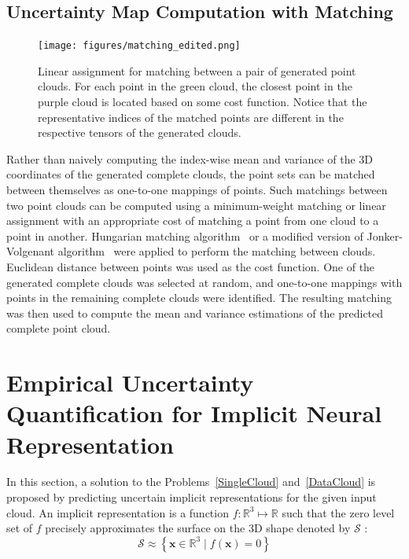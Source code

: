     \subsection{Uncertainty Map Computation with Matching}
    \begin{figure}[htb]
      \begin{center}
      \texttt{[image: figures/matching\_edited.png]}
      \end{center}
      \caption{Linear assignment for matching between a pair of generated point clouds. For each point in the green cloud, the closest point in the purple cloud is located based on some cost function. Notice that the representative indices of the matched points are different in the respective tensors of the generated clouds.}\label{fig:matching}
    \end{figure}
    Rather than naively computing the index-wise mean and variance of the 3D coordinates of the generated complete clouds, the point sets can be matched between themselves as one-to-one mappings of points. Such matchings between two point clouds can be computed using a minimum-weight matching or linear assignment with an appropriate cost of matching a point from one cloud to a point in another. Hungarian matching algorithm~\cite{Hungarian} or a modified version of Jonker-Volgenant algorithm~\cite{RectAssign} were applied to perform the matching between clouds. Euclidean distance between points was used as the cost function. One of the generated complete clouds was selected at random, and one-to-one mappings with points in the remaining complete clouds were identified. The resulting matching was then used to compute the mean and variance estimations of the predicted complete point cloud.


\section{Empirical Uncertainty Quantification for Implicit Neural Representation}\label{euqinr}
In this section, a solution to the Problems~\ref{SingleCloud} and~\ref{DataCloud} is proposed by predicting uncertain implicit representations for the given input cloud. An implicit representation is a function $f: \mathbb{R}^{3} \mapsto \mathbb{R}$ such that the zero level set of $f$ precisely approximates the surface on the 3D shape denoted by $\mathcal{S}$ :
\begin{equation}
\mathcal{S} \approx \left\{\mathbf{x} \in \mathbb{R}^{3} \mid f(\mathbf{x})=0\right\}
\end{equation}
\newline

